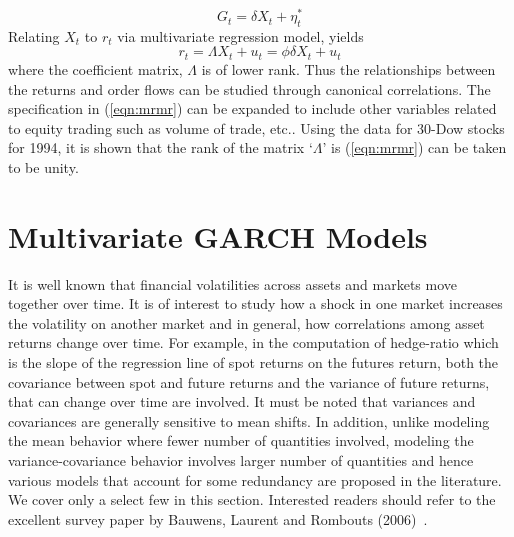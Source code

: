 	\begin{equation}\label{eqn:determinedfactors}
	G_t= \delta X_t + \eta_t^*
	\end{equation}
Relating $X_t$ to $r_t$ via multivariate regression model, yields 
	\begin{equation}\label{eqn:mrmr}
	r_t= \Lambda X_t + u_t = \phi \delta X_t + u_t
	\end{equation}
where the coefficient matrix, $\Lambda$ is of lower rank. Thus the relationships between the returns and order flows can be studied through canonical correlations. The specification in (\ref{eqn:mrmr}) can be expanded to include other variables related to equity trading such as volume of trade, etc.. Using the data for 30-Dow stocks for 1994, it is shown that the rank of the matrix `$\Lambda$' is (\ref{eqn:mrmr}) can be taken to be unity. 


















\section{Multivariate GARCH Models}


It is well known that financial volatilities across assets and markets move together over time. It is of interest to study how a shock in one market increases the volatility on another market and in general, how correlations among asset returns change over time. For example, in the computation of hedge-ratio which is the slope of the regression line of spot returns on the futures return, both the covariance between spot and future returns and the variance of future returns, that can change over time are involved. It must be noted that variances and covariances are generally sensitive to mean shifts. In addition, unlike modeling the mean behavior where fewer number of quantities involved, modeling the variance-covariance behavior involves larger number of quantities and hence various models that account for some redundancy are proposed in the literature. We cover only a select few in this section. Interested readers should refer to the excellent survey paper by Bauwens, Laurent and Rombouts (2006)~\cite{laurent}.


